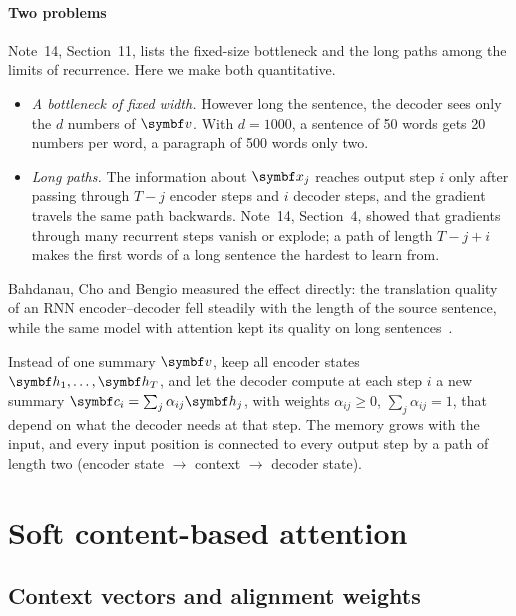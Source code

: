 \documentclass[11pt]{article}
\newcommand{\hv}{\vect{h}}
\newcommand{\cv}{\vect{c}}
\newcommand{\vv}{\vect{v}}
\begin{document}
\paragraph{Two problems} Note~14, Section~11, lists the fixed-size bottleneck and the long paths among the limits of
recurrence. Here we make both quantitative.
\begin{itemize}
\item \emph{A bottleneck of fixed width.} However long the sentence, the decoder sees only the $d$ numbers of $\vv$. With
  $d = 1000$, a sentence of 50 words gets 20 numbers per word, a paragraph of 500 words only two.
\item \emph{Long paths.} The information about $\x_j$ reaches output step $i$ only after passing through $T - j$ encoder
  steps and $i$ decoder steps, and the gradient travels the same path backwards. Note~14, Section~4, showed that gradients
  through many recurrent steps vanish or explode; a path of length $T - j + i$ makes the first words of a long sentence the
  hardest to learn from.
\end{itemize}
Bahdanau, Cho and Bengio measured the effect directly: the translation quality of an RNN encoder--decoder fell
steadily with the length of the source sentence, while the same model with attention kept its quality on long
sentences~\cite{bahdanau2015}.

\begin{keyidea}
Instead of one summary $\vv$, keep all encoder states $\hv_1, \dots, \hv_T$, and let the decoder compute at each step $i$
a new summary $\cv_i = \sum_j \alpha_{ij}\hv_j$, with weights $\alpha_{ij} \ge 0$, $\sum_j \alpha_{ij} = 1$, that depend on
what the decoder needs at that step. The memory grows with the input, and every input position is connected to every
output step by a path of length two (encoder state $\to$ context $\to$ decoder state).
\end{keyidea}

\section{Soft content-based attention}\label{sec:soft}

\subsection{Context vectors and alignment weights}\label{sec:context}
\end{document}
